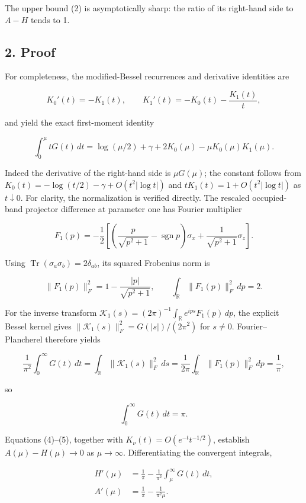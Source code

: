 \documentclass[
  10pt,
  a4paper,
]{article}
\begin{document}
The upper bound (2) is asymptotically sharp: the ratio of its right-hand side to \(A-H\) tends to 1.

\subsection{2. Proof}\label{proof}

For completeness, the modified-Bessel recurrences and derivative identities are

\[
K_0'(t)=-K_1(t),\qquad
K_1'(t)=-K_0(t)-\frac{K_1(t)}t,
\]

and yield the exact first-moment identity

\[
\int_0^\mu tG(t)\,dt=
\log(\mu/2)+\gamma+2K_0(\mu)-\mu K_0(\mu)K_1(\mu).
\tag{4}
\]

Indeed the derivative of the right-hand side is \(\mu G(\mu)\); the constant follows from \(K_0(t)=-\log(t/2)-\gamma+O(t^2|\log t|)\) and \(tK_1(t)=1+O(t^2|\log t|)\) as \(t\downarrow0\). For clarity, the normalization is verified directly. The rescaled occupied-band projector difference at parameter one has Fourier multiplier

\[
F_1(p)=-\frac12\left[\left(\frac{p}{\sqrt{p^2+1}}-\operatorname{sgn}p\right)\sigma_x+\frac1{\sqrt{p^2+1}}\sigma_z\right].
\]

Using \(\operatorname{Tr}(\sigma_a\sigma_b)=2\delta_{ab}\), its squared Frobenius norm is

\[
\|F_1(p)\|_F^2=1-\frac{|p|}{\sqrt{p^2+1}},\qquad
\int_{\mathbb R}\|F_1(p)\|_F^2\,dp=2.
\]

For the inverse transform \(\mathcal K_1(s)=(2\pi)^{-1}\int_{\mathbb R}e^{ips}F_1(p)\,dp\), the explicit Bessel kernel gives \(\|\mathcal K_1(s)\|_F^2=G(|s|)/(2\pi^2)\) for \(s\ne0\). Fourier--Plancherel therefore yields

\[
\frac1{\pi^2}\int_0^\infty G(t)\,dt
=\int_{\mathbb R}\|\mathcal K_1(s)\|_F^2\,ds
=\frac1{2\pi}\int_{\mathbb R}\|F_1(p)\|_F^2\,dp=\frac1\pi,
\]

so

\[
\boxed{\int_0^\infty G(t)\,dt=\pi.}
\tag{5}
\]

Equations (4)--(5), together with \(K_\nu(t)=O(e^{-t}t^{-1/2})\), establish \(A(\mu)-H(\mu)\to0\) as \(\mu\to\infty\). Differentiating the convergent integrals,

\[
\begin{aligned}
H'(\mu)&=\frac1\pi-\frac1{\pi^2}\int_\mu^\infty G(t)\,dt,\\
A'(\mu)&=\frac1\pi-\frac1{\pi^2\mu}.
\end{aligned}
\]
\end{document}
